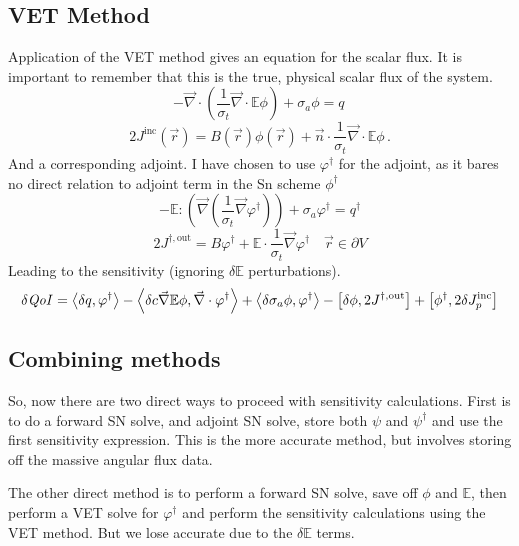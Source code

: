\documentclass{article}
\newcommand{\vr}{\vec{r}}
\newcommand{\bra}{\left\langle}
\newcommand{\ket}{\right\rangle}
\newcommand{\sbra}{\left[}
\newcommand{\sket}{\right]}
\renewcommand{\div}{\vec{\nabla} \cdot}
\newcommand{\grad}{\vec{\nabla}}
\newcommand{\bound}{\partial V}
\newcommand{\vn}{\vec{n}}
\newcommand{\Edd}{\mathbb{E}}
\newcommand{\BEdd}{B}
\newcommand{\sigt}{\sigma_t}
\newcommand{\siga}{\sigma_a}
\newcommand{\scalSource}{q}
\newcommand{\scalResp}{q^\dag}
\newcommand{\qoi}{{\it QoI}\xspace}
\begin{document}
\subsection{VET Method}
Application of the VET method gives an equation for the scalar flux. It is important to remember that this is the true, physical scalar flux of the system.
\begin{equation}
\label{VEFForm}
- \div \left( \frac{1}{\sigt}\div \Edd \phi \right) + \siga \phi = \scalSource \,
\end{equation}
\begin{equation}
2 J^{\text{inc}}(\vr) = \BEdd(\vr) \phi(\vr) + \vn \cdot \frac{1}{\sigt} \div \Edd \phi \,.
\end{equation}
And a corresponding adjoint. I have chosen to use $\varphi^\dag$ for the adjoint, as it bares no direct relation to adjoint term in the Sn scheme $\phi^\dag$
\begin{equation}
\label{adjForm}
- \Edd : \left( \grad \left( \frac{1}{\sigt}\grad \varphi^\dag \right) \right) + \siga \varphi^\dag = \scalResp
\end{equation}
\begin{equation}
\label{adjVETBC}
2J^{\dag,\text{out}} = B \varphi^\dag + 
\Edd \cdot \frac{1}{\sigma_{t} } \vec{\nabla} \varphi^\dag   \quad \vr \in \bound
\end{equation}
Leading to the sensitivity (ignoring $\delta \Edd$ perturbations).
\begin{equation}
\delta \qoi = \bra \delta q , \varphi^\dag \ket - \bra \delta c \grad \Edd \phi, \div \varphi^\dag \ket + \bra \delta \sigma_a \phi, \varphi^\dag \ket - \sbra \delta \phi, 2J^{\dag,\text{out}} \sket + \sbra \phi^\dag, 2 \delta J_p^{\text{inc}} \sket
\end{equation}

\subsection{Combining methods}
So, now there are two direct ways to proceed with sensitivity calculations. First is to do a forward SN solve, and adjoint SN solve, store both $\psi$ and $\psi^\dag$ and use the first sensitivity expression. This is the more accurate method, but involves storing off the massive angular flux data.

The other direct method is to perform a forward SN solve, save off $\phi$ and $\Edd$, then perform a VET solve for $\varphi^\dag$ and perform the sensitivity calculations using the VET method. But we lose accurate due to the $\delta \Edd$ terms.
\end{document}
